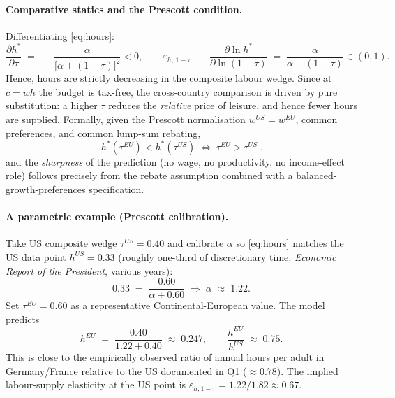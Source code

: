 \documentclass[11pt,a4paper]{article}
\begin{document}
\paragraph{Comparative statics and the Prescott condition.}
Differentiating \eqref{eq:hours}:
\begin{equation}
\frac{\partial h^{*}}{\partial \tau}\;=\;-\,\frac{\alpha}{\bigl[\alpha+(1-\tau)\bigr]^{2}}<0,\qquad
\varepsilon_{h,\,1-\tau}\;\equiv\;\frac{\partial\ln h^{*}}{\partial\ln(1-\tau)}\;=\;\frac{\alpha}{\alpha+(1-\tau)}\in(0,1).
\label{eq:elast}
\end{equation}
Hence, hours are strictly decreasing in the composite labour wedge. Since at $c=wh$ the budget is tax-free, the cross-country comparison is driven by pure substitution: a higher $\tau$ reduces the \emph{relative} price of leisure, and hence fewer hours are supplied. Formally, given the Prescott normalisation $w^{US}=w^{EU}$, common preferences, and common lump-sum rebating,
\begin{equation}
\boxed{\;h^{*}(\tau^{EU})<h^{*}(\tau^{US})\;\Longleftrightarrow\;\tau^{EU}>\tau^{US}\;,}
\label{eq:condition}
\end{equation}
and the \emph{sharpness} of the prediction (no wage, no productivity, no income-effect role) follows precisely from the rebate assumption combined with a balanced-growth-preferences specification.

\paragraph{A parametric example (Prescott calibration).}
Take US composite wedge $\tau^{US}=0.40$ and calibrate $\alpha$ so \eqref{eq:hours} matches the US data point $h^{US}=0.33$ (roughly one-third of discretionary time, \emph{Economic Report of the President}, various years):
\[
0.33 \;=\; \frac{0.60}{\alpha+0.60}\;\Longrightarrow\; \alpha \;\approx\; 1.22.
\]
Set $\tau^{EU}=0.60$ as a representative Continental-European value. The model predicts
\[
h^{EU}\;=\;\frac{0.40}{1.22+0.40}\;\approx\;0.247,\qquad
\frac{h^{EU}}{h^{US}}\;\approx\;0.75.
\]
This is close to the empirically observed ratio of annual hours per adult in Germany/France relative to the US documented in Q1 ($\approx 0.78$). The implied labour-supply elasticity at the US point is $\varepsilon_{h,1-\tau}= 1.22/1.82\approx 0.67$.
\end{document}
